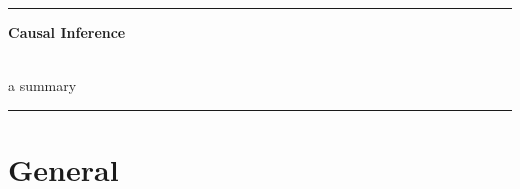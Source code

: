 \documentclass[8pt,oneside]{extarticle}
\begin{document}
\vspace*{18em}

\hrule
\begin{center}
{\fontsize{30}{60}\selectfont \textbf{Causal Inference}} \\ \

{\fontsize{20}{60}\selectfont a summary}
\end{center}
\hrule



\tableofcontents



\raggedright %
\setlength{\parindent}{15pt} %
\setlength{\columnseprule}{0.3pt} %









\section{General}
\end{document}
